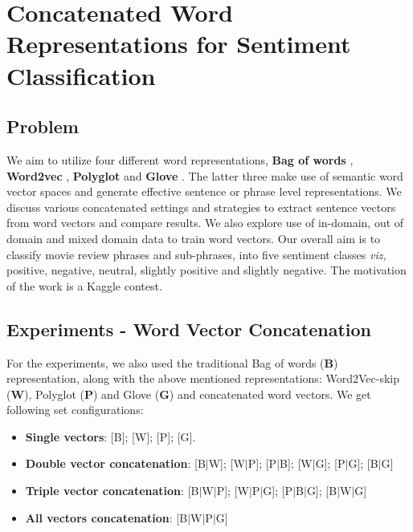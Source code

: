 	\chapter{Concatenated Word Representations for Sentiment Classification}\label{chapter:wordrepresentation}

\section{Problem}
We aim to utilize four different word representations, \textbf{Bag of words} \cite{Bow:1954}, \textbf{Word2vec} \parencite{mikolov1}, \textbf{Polyglot} \parencite{polyglot:2013:ACL-CoNLL} and \textbf{Glove} \parencite{glove}. The latter three make use of semantic word vector spaces and generate effective sentence or phrase level representations. We discuss various concatenated settings and strategies to extract sentence vectors from word vectors and compare results. We also explore use of in-domain, out of domain and mixed domain data to train word vectors. Our overall aim is to classify movie review phrases and sub-phrases, into five sentiment classes \textit{viz,} positive, negative, neutral, slightly positive and slightly negative. The motivation of the work is a Kaggle contest\footnotemark {}.

\section{Experiments - Word Vector Concatenation}
	For the experiments, we also used the traditional Bag of words (\textbf{B}) representation, along with the above mentioned representations: Word2Vec-skip (\textbf{W}), Polyglot (\textbf{P}) and Glove (\textbf{G}) and concatenated word vectors. We get following set configurations:

\begin{itemize}
	\itemsep-0.5em 
	\item \textbf{Single vectors}: [B]; [W]; [P]; [G].
	\item \textbf{Double vector concatenation}: [B$|$W]; [W$|$P]; [P$|$B]; [W$|$G]; [P$|$G]; [B$|$G]
	\item \textbf{Triple vector concatenation}: [B$|$W$|$P]; [W$|$P$|$G]; [P$|$B$|$G]; [B$|$W$|$G]
	\item \textbf{All vectors concatenation}: [B$|$W$|$P$|$G]
\end{itemize}

